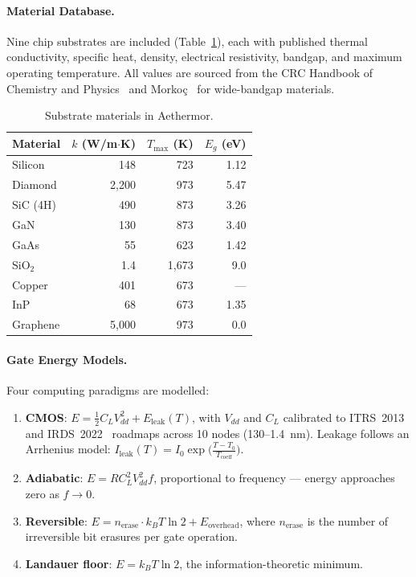 \documentclass[11pt,twocolumn]{article}
\begin{document}
\paragraph{Material Database.}
Nine chip substrates are included (Table~\ref{tab:materials}), each
with published thermal conductivity, specific heat, density,
electrical resistivity, bandgap, and maximum operating temperature.
All values are sourced from the CRC Handbook of Chemistry and
Physics~\cite{crc97} and Morko\c{c}~\cite{morkoc2006,morkoc2008}
for wide-bandgap materials.

\begin{table}[t]
\centering
\caption{Substrate materials in Aethermor.}
\label{tab:materials}
\small
\begin{tabular}{@{}lrrr@{}}
\toprule
Material & $k$ (W/m$\cdot$K) & $T_{\max}$ (K) & $E_g$ (eV) \\
\midrule
Silicon          & 148   & 723  & 1.12 \\
Diamond          & 2{,}200 & 973  & 5.47 \\
SiC (4H)         & 490   & 873  & 3.26 \\
GaN              & 130   & 873  & 3.40 \\
GaAs             & 55    & 623  & 1.42 \\
SiO$_2$          & 1.4   & 1{,}673 & 9.0 \\
Copper           & 401   & 673  & ---  \\
InP              & 68    & 673  & 1.35 \\
Graphene         & 5{,}000 & 973  & 0.0  \\
\bottomrule
\end{tabular}
\end{table}

\paragraph{Gate Energy Models.}
Four computing paradigms are modelled:
\begin{enumerate}[nosep]
  \item \textbf{CMOS}: $E = \tfrac{1}{2} C_L V_{dd}^2 + E_{\mathrm{leak}}(T)$,
    with $V_{dd}$ and $C_L$ calibrated to ITRS~2013~\cite{itrs2013} and
    IRDS~2022~\cite{irds2022} roadmaps across 10 nodes (130--1.4~nm).
    Leakage follows an Arrhenius model: $I_{\mathrm{leak}}(T) = I_0
    \exp\!\bigl(\tfrac{T - T_0}{T_{\mathrm{coeff}}}\bigr)$.
  \item \textbf{Adiabatic}: $E = R C_L^2 V_{dd}^2 f$, proportional to
    frequency --- energy approaches zero as $f \to 0$.
  \item \textbf{Reversible}: $E = n_{\mathrm{erase}} \cdot k_B T \ln 2 +
    E_{\mathrm{overhead}}$, where $n_{\mathrm{erase}}$ is the number
    of irreversible bit erasures per gate operation.
  \item \textbf{Landauer floor}: $E = k_B T \ln 2$, the
    information-theoretic minimum.
\end{enumerate}
\end{document}
